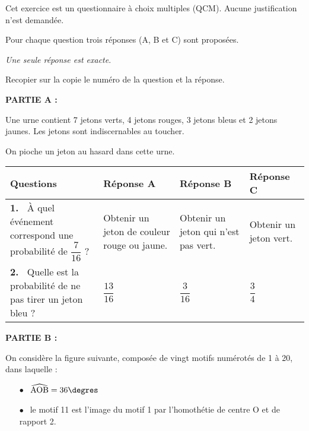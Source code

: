
\medskip

Cet exercice est un questionnaire à choix multiples (QCM). Aucune justification n'est demandée.

Pour chaque question trois réponses (A, B et C) sont proposées. 

\emph{Une seule réponse est exacte}. 

Recopier sur la copie le numéro de la question et la réponse.

\bigskip

\textbf{PARTIE A :}

\medskip

Une urne contient 7 jetons verts, 4 jetons rouges, 3 jetons bleus et 2 jetons jaunes. Les jetons sont indiscernables au toucher. 

On pioche un jeton au hasard dans cette urne.

\begin{center}
\begin{tabularx}{\linewidth}{|m{2.25cm}|*{3}{X|}}\hline
\textbf{Questions}&\textbf{Réponse A}&\textbf{Réponse B}&\textbf{Réponse C}\\ \hline
\textbf{1.~} À quel événement correspond une probabilité de $\dfrac{7}{16}$ ?&Obtenir un jeton de couleur rouge ou jaune.&Obtenir un jeton qui n'est pas vert.&Obtenir un jeton vert.\\ \hline
\textbf{2.~} Quelle est la probabilité de ne pas tirer un jeton
bleu ?& \qquad \qquad$\dfrac{13}{16}$ &\qquad  \qquad$\dfrac{3}{16}$ &\qquad  \qquad$\dfrac{3}{4}$\\ \hline
\end{tabularx}
\end{center}

\bigskip

\textbf{PARTIE B :}

\medskip

On considère la figure suivante, composée de vingt motifs numérotés de 1 à 20, dans laquelle : 

\setlength\parindent{9mm}
\begin{itemize}
\item[$\bullet~~$] $\widehat{\text{AOB}} =  36\degres$
\item[$\bullet~~$] le motif 11 est l'image du motif 1 par l'homothétie de centre O et de rapport 2.
\end{itemize}
\setlength\parindent{0mm}

